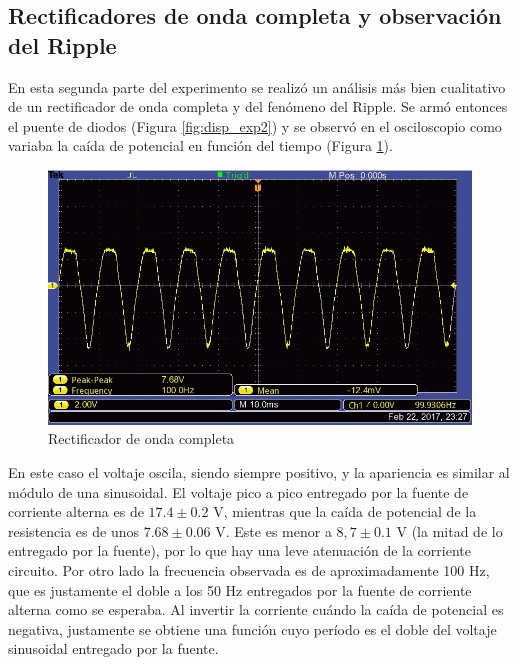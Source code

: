 \documentclass[twoside,twocolumn,a4paper]{article}
\begin{document}
\subsection{Rectificadores de onda completa y observaci\'on del Ripple}
En esta segunda parte del experimento se realiz\'o un an\'alisis m\'as bien cualitativo de un rectificador de onda completa y del fen\'omeno del Ripple. Se arm\'o entonces el puente de diodos (Figura \ref{fig:disp_exp2}) y se observ\'o en el osciloscopio como variaba la ca\'ida de potencial en funci\'on del tiempo (Figura \ref{fig:noripple}).\par

\begin{figure}[h]
\includegraphics[width=\linewidth]{noripple.jpg}
\captionsetup{justification=centering}
\caption{Rectificador de onda completa}
\label{fig:noripple}
\end{figure} 

En este caso el voltaje oscila, siendo siempre positivo, y la apariencia es similar al m\'odulo de una sinusoidal. El voltaje pico a pico entregado por la fuente de corriente alterna es de $17.4\pm0.2$ V, mientras que la ca\'ida de potencial de la resistencia es de unos $7.68\pm0.06$ V. Este es menor a $8,7\pm0.1$ V (la mitad de lo entregado por la fuente), por lo que hay una leve atenuaci\'on de la corriente circuito. Por otro lado la frecuencia observada es de aproximadamente 100 Hz, que es justamente el doble a los 50 Hz entregados por la fuente de corriente alterna como se esperaba. Al invertir la corriente cu\'ando la ca\'ida de potencial es negativa, justamente se obtiene una funci\'on cuyo per\'iodo es el doble del voltaje sinusoidal entregado por la fuente.\par 
\end{document}
